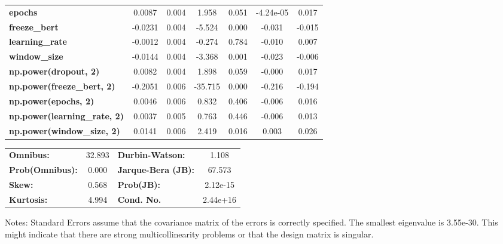 \begin{center}
\begin{tabular}{lcccccc}
\textbf{epochs}                            &       0.0087  &        0.004     &     1.958  &         0.051        &    -4.24e-05    &        0.017     \\
\textbf{freeze\_bert}                      &      -0.0231  &        0.004     &    -5.524  &         0.000        &       -0.031    &       -0.015     \\
\textbf{learning\_rate}                    &      -0.0012  &        0.004     &    -0.274  &         0.784        &       -0.010    &        0.007     \\
\textbf{window\_size}                      &      -0.0144  &        0.004     &    -3.368  &         0.001        &       -0.023    &       -0.006     \\
\textbf{np.power(dropout, 2)}              &       0.0082  &        0.004     &     1.898  &         0.059        &       -0.000    &        0.017     \\
\textbf{np.power(freeze\_bert, 2)}         &      -0.2051  &        0.006     &   -35.715  &         0.000        &       -0.216    &       -0.194     \\
\textbf{np.power(epochs, 2)}               &       0.0046  &        0.006     &     0.832  &         0.406        &       -0.006    &        0.016     \\
\textbf{np.power(learning\_rate, 2)}       &       0.0037  &        0.005     &     0.763  &         0.446        &       -0.006    &        0.013     \\
\textbf{np.power(window\_size, 2)}         &       0.0141  &        0.006     &     2.419  &         0.016        &        0.003    &        0.026     \\
\bottomrule
\end{tabular}
\begin{tabular}{lclc}
\textbf{Omnibus:}       & 32.893 & \textbf{  Durbin-Watson:     } &    1.108  \\
\textbf{Prob(Omnibus):} &  0.000 & \textbf{  Jarque-Bera (JB):  } &   67.573  \\
\textbf{Skew:}          &  0.568 & \textbf{  Prob(JB):          } & 2.12e-15  \\
\textbf{Kurtosis:}      &  4.994 & \textbf{  Cond. No.          } & 2.44e+16  \\
\bottomrule
\end{tabular}
\end{center}

Notes: \newline
 [1] Standard Errors assume that the covariance matrix of the errors is correctly specified. \newline
 [2] The smallest eigenvalue is 3.55e-30. This might indicate that there are \newline
 strong multicollinearity problems or that the design matrix is singular.